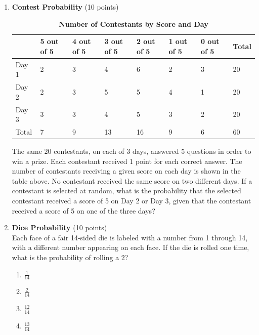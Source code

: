 \begin{enumerate}
  \item \textbf{Contest Probability} (10 points)\\
  \begin{table}[h!]
  \centering
  \renewcommand{\arraystretch}{1.3}
  \setlength{\tabcolsep}{8pt}
  \caption*{\textbf{Number of Contestants by Score and Day}}
  \begin{tabular}{|l|l|l|l|l|l|l|l|}
  \hline
  \rowcolor[HTML]{E0E0E0}
   & \textbf{5 out of 5} & \textbf{4 out of 5} & \textbf{3 out of 5} & \textbf{2 out of 5} & \textbf{1 out of 5} & \textbf{0 out of 5} & \textbf{Total} \\
  \hline
  Day 1 & 2 & 3 & 4 & 6 & 2 & 3 & 20 \\
  \hline
  Day 2 & 2 & 3 & 5 & 5 & 4 & 1 & 20 \\
  \hline
  Day 3 & 3 & 3 & 4 & 5 & 3 & 2 & 20 \\
  \hline
  Total & 7 & 9 & 13 & 16 & 9 & 6 & 60 \\
  \hline
  \end{tabular}
  \end{table}
  The same 20 contestants, on each of 3 days, answered 5 questions in order to win a prize. Each contestant received 1 point for each correct answer. The number of contestants receiving a given score on each day is shown in the table above. No contestant received the same score on two different days. If a contestant is selected at random, what is the probability that the selected contestant received a score of 5 on Day 2 or Day 3, given that the contestant received a score of 5 on one of the three days?
  \begin{subanswer}
  \end{subanswer}

  \newpage

  \item \textbf{Dice Probability} (10 points)\\
  Each face of a fair 14-sided die is labeled with a number from 1 through 14, with a different number appearing on each face. If the die is rolled one time, what is the probability of rolling a 2?
  \begin{enumerate}[label=(\Alph*)]
    \item $\frac{1}{14}$
    \item $\frac{2}{14}$
    \item $\frac{12}{14}$
    \item $\frac{13}{14}$
  \end{enumerate}
  \begin{subanswer}
  \end{subanswer}


\end{enumerate}
